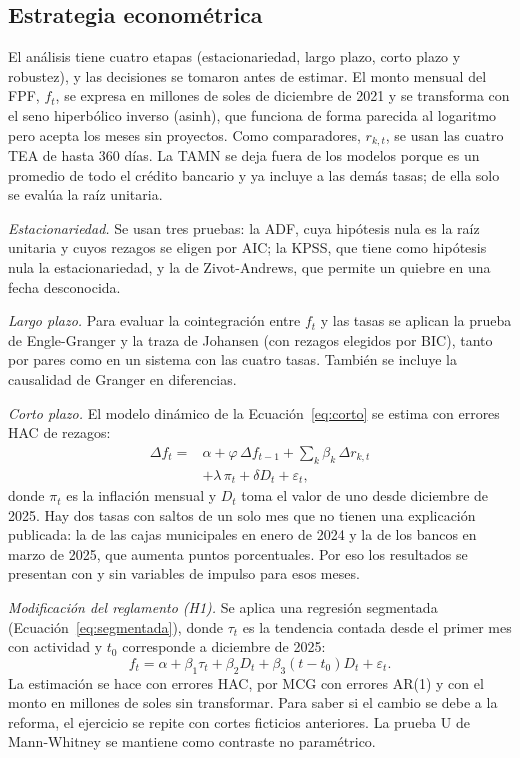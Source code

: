 \subsection{Estrategia econométrica}

El análisis tiene cuatro etapas (estacionariedad, largo plazo, corto plazo y robustez), y las decisiones se tomaron antes de estimar. El monto mensual del FPF, $f_t$, se expresa en millones de soles de diciembre de 2021 y se transforma con el seno hiperbólico inverso (asinh), que funciona de forma parecida al logaritmo pero acepta los meses sin proyectos. Como comparadores, $r_{k,t}$, se usan las cuatro TEA de hasta 360 días. La TAMN se deja fuera de los modelos porque es un promedio de todo el crédito bancario y ya incluye a las demás tasas; de ella solo se evalúa la raíz unitaria.

\textit{Estacionariedad.} Se usan tres pruebas: la ADF, cuya hipótesis nula es la raíz unitaria y cuyos rezagos se eligen por AIC; la KPSS, que tiene como hipótesis nula la estacionariedad, y la de Zivot-Andrews, que permite un quiebre en una fecha desconocida.

\textit{Largo plazo.} Para evaluar la cointegración entre $f_t$ y las tasas se aplican la prueba de Engle-Granger y la traza de Johansen (con rezagos elegidos por BIC), tanto por pares como en un sistema con las cuatro tasas. También se incluye la causalidad de Granger en diferencias.

\textit{Corto plazo.} El modelo dinámico de la Ecuación~\ref{eq:corto} se estima con errores HAC de  rezagos:
\begin{equation}\label{eq:corto}
\begin{split}
\Delta f_t ={}& \alpha+\varphi\,\Delta f_{t-1}+\textstyle\sum_k\beta_k\,\Delta r_{k,t}\\
&+\lambda\,\pi_t+\delta D_t+\varepsilon_t,
\end{split}
\end{equation}
donde $\pi_t$ es la inflación mensual y $D_t$ toma el valor de uno desde diciembre de 2025. Hay dos tasas con saltos de un solo mes que no tienen una explicación publicada: la de las cajas municipales en enero de 2024 y la de los bancos en marzo de 2025, que aumenta  puntos porcentuales. Por eso los resultados se presentan con y sin variables de impulso para esos meses.

\textit{Modificación del reglamento (H1).} Se aplica una regresión segmentada (Ecuación~\ref{eq:segmentada}), donde $\tau_t$ es la tendencia contada desde el primer mes con actividad y $t_0$ corresponde a diciembre de 2025:
\begin{equation}\label{eq:segmentada}
f_t=\alpha+\beta_1\tau_t+\beta_2D_t+\beta_3(t-t_0)D_t+\varepsilon_t.
\end{equation}
La estimación se hace con errores HAC, por MCG con errores AR(1) y con el monto en millones de soles sin transformar. Para saber si el cambio se debe a la reforma, el ejercicio se repite con  cortes ficticios anteriores. La prueba U de Mann-Whitney se mantiene como contraste no paramétrico.

